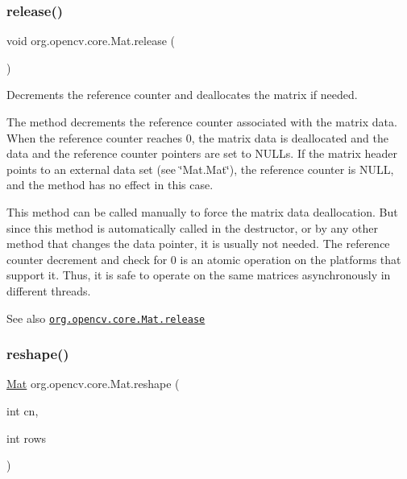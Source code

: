 \mbox{\label{classorg_1_1opencv_1_1core_1_1_mat_afb0f872783792b1ba415c2dfcf088a14}} 
\subsubsection{\texorpdfstring{release()}{release()}}
{\footnotesize\ttfamily void org.\+opencv.\+core.\+Mat.\+release (\begin{DoxyParamCaption}{ }\end{DoxyParamCaption})}

Decrements the reference counter and deallocates the matrix if needed.

The method decrements the reference counter associated with the matrix data. When the reference counter reaches 0, the matrix data is deallocated and the data and the reference counter pointers are set to N\+U\+LL\textquotesingle{}s. If the matrix header points to an external data set (see \char`\"{}\+Mat.\+Mat\char`\"{}), the reference counter is N\+U\+LL, and the method has no effect in this case.

This method can be called manually to force the matrix data deallocation. But since this method is automatically called in the destructor, or by any other method that changes the data pointer, it is usually not needed. The reference counter decrement and check for 0 is an atomic operation on the platforms that support it. Thus, it is safe to operate on the same matrices asynchronously in different threads.

\begin{DoxySeeAlso}{See also}
\href{http://docs.opencv.org/modules/core/doc/basic_structures.html#mat-release}{\tt org.\+opencv.\+core.\+Mat.\+release} 
\end{DoxySeeAlso}
\mbox{\label{classorg_1_1opencv_1_1core_1_1_mat_ac272e7518dba0da8e7480df63163040b}} 
\subsubsection{\texorpdfstring{reshape()}{reshape()}\hspace{0.1cm}{\footnotesize\ttfamily [1/2]}}
{\footnotesize\ttfamily \mbox{\hyperlink{classorg_1_1opencv_1_1core_1_1_mat}{Mat}} org.\+opencv.\+core.\+Mat.\+reshape (\begin{DoxyParamCaption}\item[{int}]{cn,  }\item[{int}]{rows }\end{DoxyParamCaption})}

